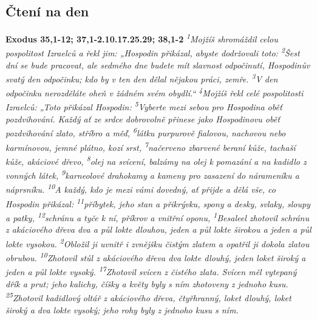 \documentclass[11pt]{article}
\begin{document}
\subsection*{Čtení na den}
\textbf{Exodus 35,1-12; 37,1-2.10.17.25.29; 38,1-2}
\newline
\textit{
\textsuperscript{1}Mojžíš shromáždil celou pospolitost Izraelců a řekl jim: „Hospodin přikázal, abyste dodržovali toto:
\textsuperscript{2}Šest dní se bude pracovat, ale sedmého dne budete mít slavnost odpočinutí, Hospodinův svatý den odpočinku; kdo by v ten den dělal nějakou práci, zemře.
\textsuperscript{3}V den odpočinku nerozděláte oheň v žádném svém obydlí.“
\textsuperscript{4}Mojžíš řekl celé pospolitosti Izraelců: „Toto přikázal Hospodin:
\textsuperscript{5}Vyberte mezi sebou pro Hospodina oběť pozdvihování. Každý ať ze srdce dobrovolně přinese jako Hospodinovu oběť pozdvihování zlato, stříbro a měď,
\textsuperscript{6}látku purpurově fialovou, nachovou nebo karmínovou, jemné plátno, kozí srst,
\textsuperscript{7}načerveno zbarvené beraní kůže, tachaší kůže, akáciové dřevo,
\textsuperscript{8}olej na svícení, balzámy na olej k pomazání a na kadidlo z vonných látek,
\textsuperscript{9}karneolové drahokamy a kameny pro zasazení do nárameníku a náprsníku.
\textsuperscript{10}A každý, kdo je mezi vámi dovedný, ať přijde a dělá vše, co Hospodin přikázal:
\textsuperscript{11}příbytek, jeho stan a přikrývku, spony a desky, svlaky, sloupy a patky,
\textsuperscript{12}schránu a tyče k ní, příkrov a vnitřní oponu,
\newline
\newline
\textsuperscript{1}Besaleel zhotovil schránu z akáciového dřeva dva a půl lokte dlouhou, jeden a půl lokte širokou a jeden a půl lokte vysokou.
\textsuperscript{2}Obložil ji uvnitř i zvnějšku čistým zlatem a opatřil ji dokola zlatou obrubou.
\newline
\newline
\textsuperscript{10}Zhotovil stůl z akáciového dřeva dva lokte dlouhý, jeden loket široký a jeden a půl lokte vysoký.
\newline
\newline
\textsuperscript{17}Zhotovil svícen z čistého zlata. Svícen měl vytepaný dřík a prut; jeho kalichy, číšky a květy byly s ním zhotoveny z jednoho kusu.
\newline
\newline
\textsuperscript{25}Zhotovil kadidlový oltář z akáciového dřeva, čtyřhranný, loket dlouhý, loket široký a dva lokte vysoký; jeho rohy byly z jednoho kusu s ním.
\newline
}
\end{document}

